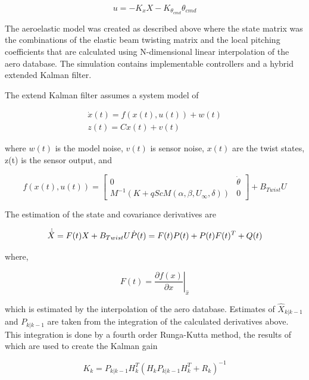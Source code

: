 \documentclass[11pt]{ucthesis}
\begin{document}
\begin{equation}
u = -K_xX-K_{\theta_{cmd}}\theta_{cmd}
\end{equation}

The aeroelastic model was created as described above where the state matrix was the combinations of the elastic beam twisting matrix and the local pitching coefficients that are calculated using N-dimensional linear interpolation of the aero database. The simulation contains implementable controllers and a hybrid extended Kalman filter.

The extend Kalman filter assumes a system model of 

\begin{equation}
\begin{matrix}
\dot{x}(t) = f(x(t),u(t))+w(t)\\
z(t) = Cx(t)+v(t)
\end{matrix}
\end{equation}

where $w(t)$ is the model noise, $v(t)$ is sensor noise, $x(t)$ are the twist states, z(t) is the sensor output, and 

\begin{equation}
f(x(t),u(t)) = \begin{bmatrix}
0&\dot{\theta}\\
M^{-1}(K+qScM(\alpha,\beta,U_{\infty},\delta))&0\end{bmatrix}+B_{Twist}U
\end{equation}

The estimation of the state and covariance derivatives are

\begin{equation}
\dot{\hat{X}} = F(t)X+B_{Twist}U\\
\dot{P}(t) = F(t)P(t)+P(t)F(t)^T+Q(t)
\end{equation}

where,

\begin{equation}
F(t) = \left.\frac{\partial f(x)}{\partial x}\right\vert_{\hat{x}}
\end{equation}

which is estimated by the interpolation of the aero database. Estimates of $\hat{X}_{k\vert k-1}$ and $P_{k\vert k-1}$ are taken from the integration of the calculated derivatives above. This integration is done by a fourth order Runga-Kutta method, the results of which are used to create the Kalman gain

\begin{equation}
K_k = P_{k\vert k-1}H_k^T(H_kP_{k\vert k-1}H_k^T+R_k)^{-1}
\end{equation}
\end{document}
